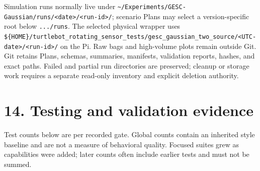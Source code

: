 \documentclass[
  10pt,
  letterpaper,
]{article}
\begin{document}
Simulation runs normally live under
\nolinkurl{\~/Experiments/GESC-Gaussian/runs/<date>/<run-id>/}; scenario Plans may select
a version-specific root below \nolinkurl{.../runs}. The selected physical wrapper uses
\nolinkurl{$\{HOME\}/turtlebot\_rotating\_sensor\_tests/gesc\_gaussian\_two\_source/<UTC-date>/<run-id>/}
on the Pi. Raw bags and high-volume plots remain outside Git. Git retains
Plans, schemas, summaries, manifests, validation reports, hashes, and exact
paths. Failed and partial run directories are preserved; cleanup or storage
work requires a separate read-only inventory and explicit deletion authority.

\section{14. Testing and validation evidence}\label{testing-and-validation-evidence}

Test counts below are per recorded gate. Global counts contain an inherited
style baseline and are not a measure of behavioral quality. Focused suites
grew as capabilities were added; later counts often include earlier tests and
must not be summed.
\end{document}
